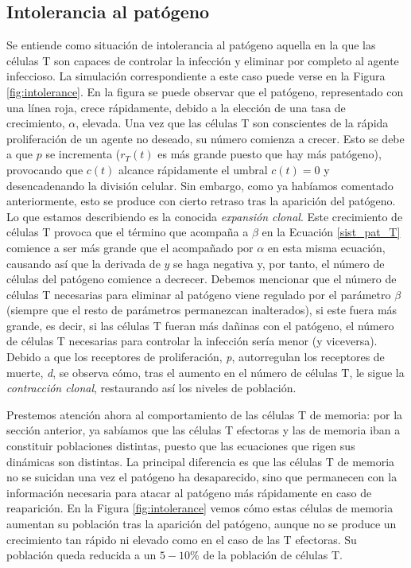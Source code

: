 \subsection{Intolerancia al patógeno}
\label{sim:intoler}

Se entiende como situación de intolerancia al patógeno aquella en la que las células T son capaces de controlar la infección y eliminar por completo al agente infeccioso. La simulación correspondiente a este caso puede verse en la Figura \ref{fig:intolerance}. En la figura se puede observar que el patógeno, representado con una línea roja, crece rápidamente, debido a la elección de una tasa de crecimiento, $\alpha$, elevada. Una vez que las células T son conscientes de la rápida proliferación de un agente no deseado, su número comienza a crecer. Esto se debe a que $p$ se incrementa ($r_{T}(t)$ es más grande puesto que hay más patógeno), provocando que $c(t)$ alcance rápidamente el umbral $c(t) = 0$ y desencadenando la división celular. Sin embargo, como ya habíamos comentado anteriormente, esto se produce con cierto retraso tras la aparición del patógeno. Lo que estamos describiendo es la conocida \textit{expansión clonal}. Este crecimiento de células T provoca que el término que acompaña a $\beta$ en la Ecuación \ref{sist_pat_T} comience a ser más grande que el acompañado por $\alpha$ en esta misma ecuación, causando así que la derivada de $y$ se haga negativa y, por tanto, el número de células del patógeno comience a decrecer. Debemos mencionar que el número de células T necesarias para eliminar al patógeno viene regulado por el parámetro $\beta$ (siempre que el resto de parámetros permanezcan inalterados), si este fuera más grande, es decir, si las células T fueran más dañinas con el patógeno, el número de células T necesarias para controlar la infección sería menor (y viceversa). Debido a que los receptores de proliferación, \textit{p}, autorregulan los receptores de muerte, \textit{d}, se observa cómo, tras el aumento en el número de células T, le sigue la \textit{contracción clonal}, restaurando así los niveles de población.

Prestemos atención ahora al comportamiento de las células T de memoria: por la sección anterior, ya sabíamos que las células T efectoras y las de memoria iban a constituir poblaciones distintas, puesto que las ecuaciones que rigen sus dinámicas son distintas. La principal diferencia es que las células T de memoria no se suicidan una vez el patógeno ha desaparecido, sino que permanecen con la información necesaria para atacar al patógeno más rápidamente en caso de reaparición. En la Figura \ref{fig:intolerance} vemos cómo estas células de memoria aumentan su población tras la aparición del patógeno, aunque no se produce un crecimiento tan rápido ni elevado como en el caso de las T efectoras. Su población queda reducida a un $5-10\%$ de la población de células T.

